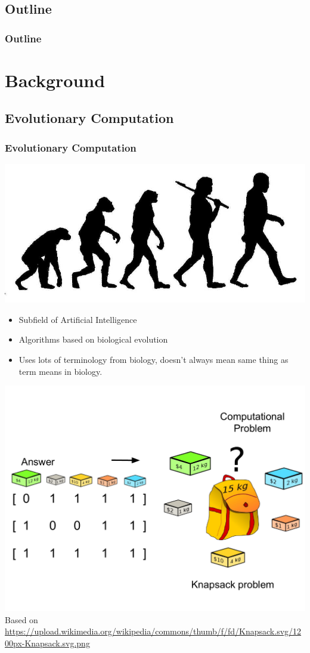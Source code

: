 \documentclass{beamer}
\newcommand{\linespace}{\vskip 0.25cm}
\begin{document}
\subsection*{Outline}

\begin{frame}
	\frametitle{Outline}
	\tableofcontents[hideallsubsections]
\end{frame}

\section[Background]{Background}

\subsection{Evolutionary Computation}

\begin{frame}
	\frametitle{Evolutionary Computation}
	\centering
	\includegraphics[width=.6\textwidth]{Illustrations/evolution.jpg}
	\\
	\large
	\begin{itemize}
		\item Subfield of Artificial Intelligence
		\pause
		\item Algorithms based on biological evolution
		\pause
		\item Uses lots of terminology from biology, doesn't always mean same thing as term means in biology.
	\end{itemize}
\end{frame}

\begin{frame}
	\centering
	\includegraphics[width=.8\textwidth]{Illustrations/gpknapsack_0.PDF}
	\linespace
	\tiny{Based on \url{https://upload.wikimedia.org/wikipedia/commons/thumb/f/fd/Knapsack.svg/1200px-Knapsack.svg.png}}
\end{frame}
\end{document}
